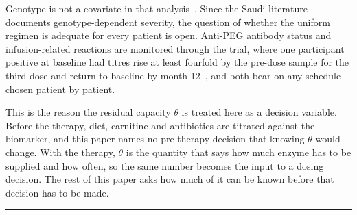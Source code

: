 Genotype is not a covariate in that analysis~\cite{dose_selection_poster}. %
Since the Saudi literature documents
genotype-dependent severity, the question of whether the uniform regimen is adequate for
every patient is open. Anti-PEG antibody status and infusion-related reactions are monitored
through the trial, where one participant positive at baseline had titres rise at least
fourfold by the pre-dose sample for the third dose and return to baseline by month
12~\cite{trial_phase12}, %
and both bear on any schedule chosen patient by patient.

This is the reason the residual capacity $\theta$ is treated here as a decision variable.
Before the therapy, diet, carnitine and antibiotics are titrated against the biomarker,
and this paper names no pre-therapy decision that knowing
$\theta$ would change. With the therapy, $\theta$ is the quantity that says how much enzyme
has to be supplied and how often, so the same number becomes the input to a dosing
decision. The rest of this paper asks how much of it
can be known before that decision has to be made.

\vspace{0.5em}
\hrule
\vspace{1em}

